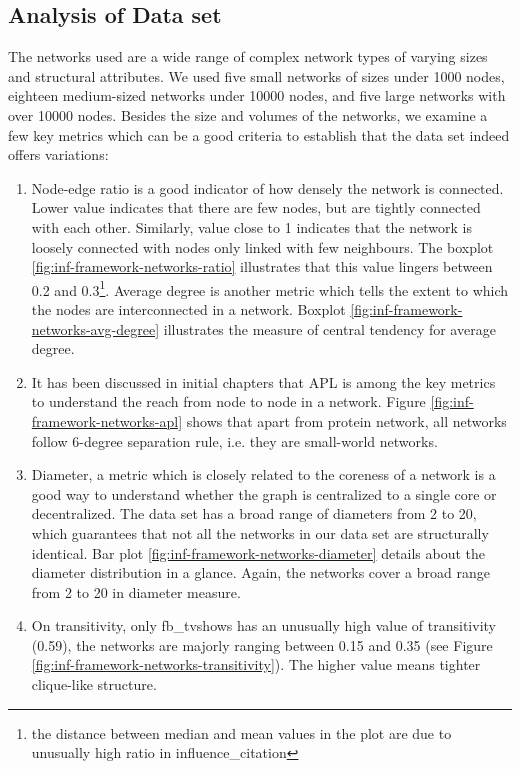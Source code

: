 		\subsection{Analysis of Data set}
		The networks used are a wide range of complex network types of varying sizes and structural attributes. We used five small networks of sizes under 1000 nodes, eighteen medium-sized networks under 10000 nodes, and five large networks with over 10000 nodes. Besides the size and volumes of the networks, we examine a few key metrics which can be a good criteria to establish that the data set indeed offers variations:
		
		\begin{enumerate}
			\item Node-edge ratio is a good indicator of how densely the network is connected. Lower value indicates that there are few nodes, but are tightly connected with each other. Similarly, value close to 1 indicates that the network is loosely connected with nodes only linked with few neighbours. The boxplot \ref{fig:inf-framework-networks-ratio} illustrates that this value lingers between 0.2 and 0.3\footnote{the distance between median and mean values in the plot are due to unusually high ratio in influence\_citation}. Average degree is another metric which tells the extent to which the nodes are interconnected in a network. Boxplot \ref{fig:inf-framework-networks-avg-degree} illustrates the measure of central tendency for average degree.
			
			\item It has been discussed in initial chapters that APL is among the key metrics to understand the reach from node to node in a network. Figure \ref{fig:inf-framework-networks-apl} shows that apart from protein network, all networks follow 6-degree separation rule, i.e. they are small-world networks.
			
			\item Diameter, a metric which is closely related to the coreness of a network is a good way to understand whether the graph is centralized to a single core or decentralized. The data set has a broad range of diameters from 2 to 20, which guarantees that not all the networks in our data set are structurally identical. Bar plot \ref{fig:inf-framework-networks-diameter} details about the diameter distribution in a glance. Again, the networks cover a broad range from 2 to 20 in diameter measure.
			
			\item On transitivity, only fb\_tvshows has an unusually high value of transitivity (0.59), the networks are majorly ranging between 0.15 and 0.35 (see Figure \ref{fig:inf-framework-networks-transitivity}). The higher value means tighter clique-like structure.
			

\end{enumerate}
